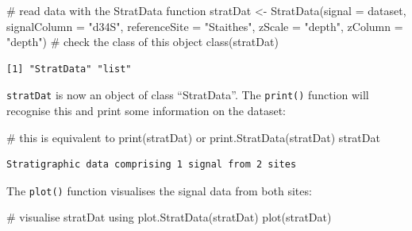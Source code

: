 \documentclass[
  letterpaper,
  DIV=11,
  numbers=noendperiod]{scrartcl}
\newenvironment{Shaded}{\begin{snugshade}}{\end{snugshade}}
\newcommand{\AttributeTok}[1]{\textcolor[rgb]{0.40,0.45,0.13}{#1}}
\newcommand{\CommentTok}[1]{\textcolor[rgb]{0.37,0.37,0.37}{#1}}
\newcommand{\FunctionTok}[1]{\textcolor[rgb]{0.28,0.35,0.67}{#1}}
\newcommand{\NormalTok}[1]{\textcolor[rgb]{0.00,0.23,0.31}{#1}}
\newcommand{\OtherTok}[1]{\textcolor[rgb]{0.00,0.23,0.31}{#1}}
\newcommand{\StringTok}[1]{\textcolor[rgb]{0.13,0.47,0.30}{#1}}
\begin{document}
\begin{Shaded}
\begin{Highlighting}[]
\CommentTok{\# read data with the StratData function}
\NormalTok{stratDat }\OtherTok{\textless{}{-}} \FunctionTok{StratData}\NormalTok{(}\AttributeTok{signal =}\NormalTok{ dataset, }\AttributeTok{signalColumn =} \StringTok{"d34S"}\NormalTok{, }
                      \AttributeTok{referenceSite =} \StringTok{"Staithes"}\NormalTok{, }
                      \AttributeTok{zScale =} \StringTok{"depth"}\NormalTok{, }\AttributeTok{zColumn =} \StringTok{"depth"}\NormalTok{)}
\CommentTok{\# check the class of this object}
\FunctionTok{class}\NormalTok{(stratDat)}
\end{Highlighting}
\end{Shaded}

\begin{verbatim}
[1] "StratData" "list"     
\end{verbatim}

\texttt{stratDat} is now an object of class ``StratData''. The
\texttt{print()} function will recognise this and print some information
on the dataset:

\begin{Shaded}
\begin{Highlighting}[]
\CommentTok{\# this is equivalent to print(stratDat) or print.StratData(stratDat)}
\NormalTok{stratDat}
\end{Highlighting}
\end{Shaded}

\begin{verbatim}
Stratigraphic data comprising 1 signal from 2 sites
\end{verbatim}

The \texttt{plot()} function visualises the signal data from both sites:

\begin{Shaded}
\begin{Highlighting}[]
\CommentTok{\# visualise stratDat using plot.StratData(stratDat)}
\FunctionTok{plot}\NormalTok{(stratDat)}
\end{Highlighting}
\end{Shaded}
\end{document}
